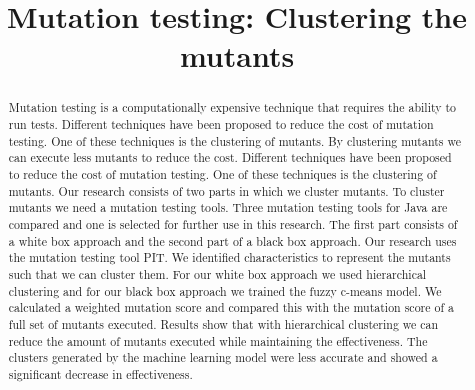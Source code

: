 \documentclass[conference]{IEEEtran}
\begin{document}
\title{Mutation testing: Clustering the mutants}


\author{

\and
{}
\and
{}
}

\maketitle
\begin{abstract}
Mutation testing is a computationally expensive technique that requires the ability to run tests.
Different techniques have been proposed to reduce the cost of mutation testing.
One of these techniques is the clustering of mutants.
By clustering mutants we can execute less mutants to reduce the cost.
Different techniques have been proposed to reduce the cost of mutation testing.
One of these techniques is the clustering of mutants.
Our research consists of two parts in which we cluster mutants.
To cluster mutants we need a mutation testing tools.
Three mutation testing tools for Java are compared and one is selected for further use in this research.
The first part consists of a white box approach and the second part of a black box approach.
Our research uses the mutation testing tool PIT.
We identified characteristics to represent the mutants such that we can cluster them.
For our white box approach we used hierarchical clustering and for our black box approach we trained the fuzzy c-means  model.
We calculated a weighted mutation score and compared this with the mutation score of a full set of mutants executed.
Results show that with hierarchical clustering we can reduce the amount of mutants executed while maintaining the effectiveness.
The clusters generated by the machine learning model were less accurate and showed a significant decrease in effectiveness.
\end{abstract}
\end{document}

